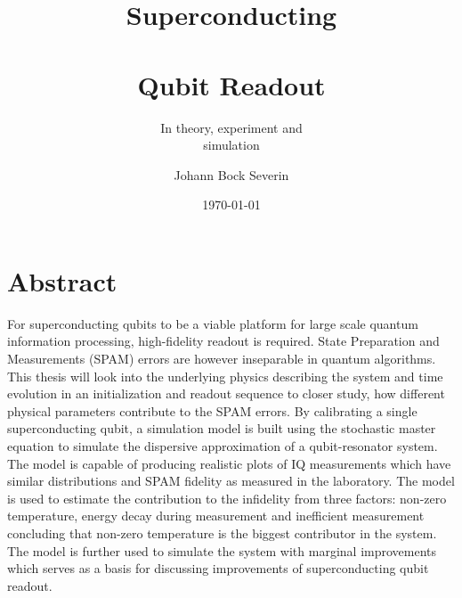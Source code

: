 


\title{Superconducting \\ \\Qubit Readout}
\author{Johann Bock Severin}
\subtitle{In theory, experiment and \\simulation}
\date{\today}


% 
\maketitlepage

\listoftodos
\chapter*{\centering Abstract}
For superconducting qubits to be a viable platform for large scale quantum information processing, high-fidelity readout is required. State Preparation and Measurements (SPAM) errors are however inseparable in quantum algorithms. This thesis will look into the underlying physics describing the system and time evolution in an initialization and readout sequence to closer study, how different physical parameters contribute to the SPAM errors. By calibrating a single superconducting qubit, a simulation model is built using the stochastic master equation to simulate the dispersive approximation of a qubit-resonator system. The model is capable of producing realistic plots of IQ measurements which have similar distributions and SPAM fidelity as measured in the laboratory. The model is used to estimate the contribution to the infidelity from three factors: non-zero temperature, energy decay during measurement and inefficient measurement concluding that non-zero temperature is the biggest contributor in the system. The model is further used to simulate the system with marginal improvements which serves as a basis for discussing improvements of superconducting qubit readout.






